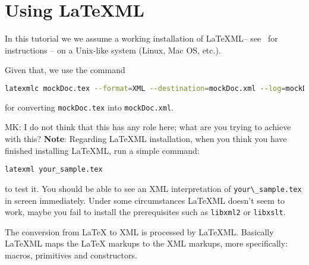 \documentclass[a4paper]{article}
\def\latexml{{\LaTeX}ML\xspace}
\begin{document}
\section{Using LaTeXML}\label{sec:using}

In this tutorial we we assume a working installation of \latexml -- see~\cite{LaTeXML:get}
for instructions -- on a Unix-like system (Linux, Mac OS, etc.). 

 Given that, we use the
command
\begin{lstlisting}[language=bash]
latexmlc mockDoc.tex --format=XML --destination=mockDoc.xml --log=mockDoc.xml.log
\end{lstlisting}
for converting \lstinline|mockDoc.tex| into \lstinline|mockDoc.xml|.

\begin{oldpart}{MK: I do not think that this has any role here; what are you trying to
    achieve with this?}
\textbf{Note}: Regarding \latexml installation, when you think you have finished installing \latexml, run a simple command:
\begin{lstlisting}
latexml your_sample.tex
\end{lstlisting}
 to test it. You should be able to see an XML interpretation of
 \lstinline|your\_sample.tex| in screen immediately. Under some circumstances \latexml
 doesn't seem to work, maybe you fail to install the prerequisites such as
 \lstinline|libxml2| or \lstinline|libxslt|.
\end{oldpart}

The conversion from {\LaTeX} to XML is processed by \latexml. Basically \latexml maps the
{\LaTeX} markups to the XML markups, more specifically: macros, primitives and
constructors.
\end{document}
